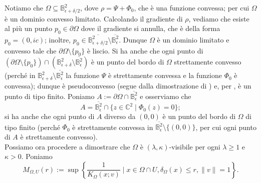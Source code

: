 Notiamo che $\Omega\subseteq\mathbb{B}^2_{\epsilon+\delta/2}$, dove $\rho=\Psi+\Phi_0$, che è una funzione convessa; per cui $\Omega$ è un dominio convesso limitato. Calcolando il gradiente di $\rho$, vediamo che esiste al più un punto $p_0\in\partial\Omega$ dove il gradiente si annulla, che è della forma $p_0=(0,ic)$; inoltre, $p_0\in\overline{\mathbb{B}^2_{\epsilon+\delta/2}}\setminus\overline{\mathbb{B}^2_\epsilon}$. Dunque $\Omega$ è un dominio limitato e convesso tale che $\partial\Omega\setminus\{p_0\}$ è liscio. Si ha anche che ogni punto di $(\partial\Omega\setminus\{p_0\})\cap(\mathbb{B}^2_{\epsilon+\delta}\setminus\overline{\mathbb{B}^2_\epsilon})$ è un punto del bordo di $\Omega$ strettamente convesso (perché in $\mathbb{B}^2_{\epsilon+\delta}\setminus\overline{\mathbb{B}^2_\epsilon}$ la funzione $\Psi$ è strettamente convessa e la funzione $\Phi_0$ è convessa); dunque è pseudoconvesso (segue dalla dimostrazione di \cite[Proposition 2.1.13]{A1}) e, per \cite[Corollary 5.6]{D'A}, è un punto di tipo finito. Poniamo $A:=\partial\Omega\cap\overline{\mathbb{B}^2_\epsilon}$ e osserviamo che
$$A=\overline{\mathbb{B}^2_\epsilon}\cap\{z\in\mathbb{C}^2\mid \Phi_0(z)=0\};$$
si ha anche che ogni punto di $A$ diverso da $(0,0)$ è un punto del bordo di $\Omega$ di tipo finito (perché $\Phi_0$ è strettamente convessa in $\overline{\mathbb{B}^2_\epsilon}\setminus\{(0,0)\}$, per cui ogni punto di $A$ è strettamente convesso). \\

Possiamo ora procedere a dimostrare che $\Omega$ è $(\lambda,\kappa)$-visibile per ogni $\lambda \ge 1$ e $\kappa>0$. Poniamo
$$M_{\Omega,U}(r):=\sup\left\{\frac{1}{K_\Omega(x;v)}\mid x\in\Omega\cap U,\delta_\Omega(x) \le r, \|v\|=1\right\}.$$

